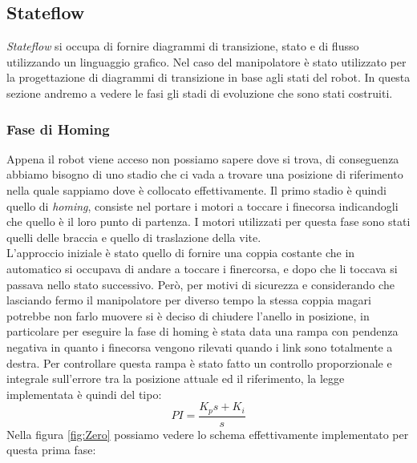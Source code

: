 \subsection{Stateflow}
\textit{Stateflow} si occupa di fornire diagrammi di transizione, stato e di flusso utilizzando un linguaggio grafico. Nel caso del manipolatore è stato utilizzato per la progettazione di diagrammi di transizione in base agli stati del robot. In questa sezione andremo a vedere le fasi gli stadi di evoluzione che sono stati costruiti.
\subsubsection{Fase di Homing}
Appena il robot viene acceso non possiamo sapere dove si trova, di conseguenza abbiamo bisogno di uno stadio che ci vada a trovare una posizione di riferimento nella quale sappiamo dove è collocato effettivamente. Il primo stadio è quindi quello di \textit{homing}, consiste nel portare i motori a toccare i finecorsa indicandogli che quello è il loro punto di partenza. I motori utilizzati per questa fase sono stati quelli delle braccia e quello di traslazione della vite.
\\L'approccio iniziale è stato quello di fornire una coppia costante che in automatico si occupava di andare a toccare i finercorsa, e dopo che li toccava si passava nello stato successivo. Però, per motivi di sicurezza e considerando che lasciando fermo il manipolatore per diverso tempo la stessa coppia magari potrebbe non farlo muovere si è deciso di chiudere l'anello in posizione, in particolare per eseguire la fase di homing è stata data una rampa con pendenza negativa in quanto i finecorsa vengono rilevati quando i link sono totalmente a destra.
Per controllare questa rampa è stato fatto un controllo proporzionale e integrale sull'errore tra la posizione attuale ed il riferimento, la legge implementata è quindi del tipo:
\begin{equation*}
	PI = \frac{K_p s + K_i}{s}
\end{equation*}
Nella figura \ref{fig:Zero} possiamo vedere lo schema effettivamente implementato per questa prima fase:
